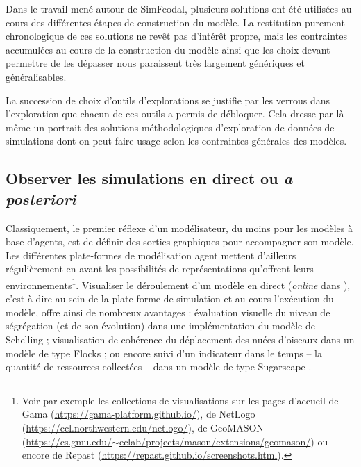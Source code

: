 Dans le travail mené autour de SimFeodal, plusieurs solutions ont été utilisées au cours des différentes étapes de construction du modèle.
La restitution purement chronologique de ces solutions ne revêt pas d'intérêt propre, mais les contraintes accumulées au cours de la construction du modèle ainsi que les choix devant permettre de les dépasser nous paraissent très largement génériques et généralisables.

La succession de choix d'outils d'explorations se justifie par les verrous dans l'exploration que chacun de ces outils a permis de débloquer.
Cela dresse par là-même un portrait des solutions méthodologiques d'exploration de données de simulations dont on peut faire usage selon les contraintes générales des modèles.

\subsection{Observer les simulations en direct ou \textit{a posteriori}}\label{subsec:observation-a-posteriori}

Classiquement, le premier réflexe d'un modélisateur, du moins pour les modèles à base d'agents, est de définir des sorties graphiques pour accompagner son modèle.
Les différentes plate-formes de modélisation agent mettent d'ailleurs régulièrement en avant les possibilités de représentations qu'offrent leurs environnements\footnote{
	Voir par exemple les collections de visualisations sur les pages d'accueil de Gama (\href{https://gama-platform.github.io/}{https://gama-platform.github.io/}), de NetLogo (\href{https://ccl.northwestern.edu/netlogo/}{https://ccl.northwestern.edu/netlogo/}), de GeoMASON (\href{https://cs.gmu.edu/~eclab/projects/mason/extensions/geomason/}{https://cs.gmu.edu/$\sim$eclab/projects/mason/extensions/geomason/}) ou encore de Repast (\href{https://repast.github.io/screenshots.html}{https://repast.github.io/screenshots.html}).
}.
Visualiser le déroulement d'un modèle \og en direct\fg{} (\og \textit{online}\fg{} dans \cite{grignard_agent-based_2017}), c'est-à-dire au sein de la plate-forme de simulation et au cours l'exécution du modèle, offre ainsi de nombreux avantages : évaluation visuelle du niveau de ségrégation (et de son évolution) dans une implémentation du modèle de Schelling ; visualisation de cohérence du déplacement des nuées d'oiseaux dans un modèle de type \og Flocks\fg{} \autocite{reynolds_flocks_1987} ; ou encore suivi d'un indicateur dans le temps -- la quantité de ressources collectées -- dans un modèle de type \og Sugarscape\fg{} \autocite{epstein_growing_1996}.

